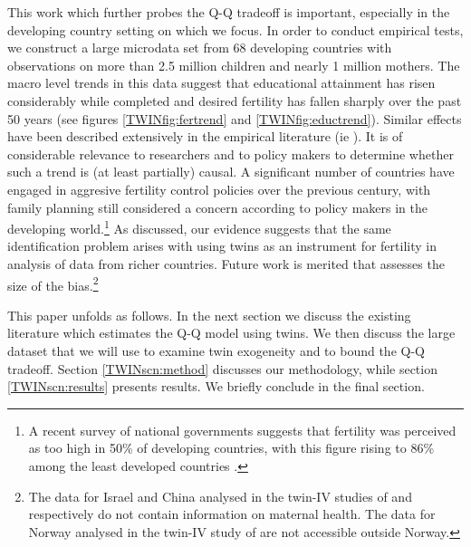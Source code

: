 This work which further probes the Q-Q tradeoff is important, especially in the 
developing country setting on which we focus. In order to conduct empirical tests, 
we construct a large microdata set from 68 developing countries with observations on 
more than 2.5 million children and nearly 1 million mothers. The macro level trends in 
this data suggest that educational attainment has risen considerably while completed 
and desired fertility has fallen sharply over the past 50 years (see figures 
\ref{TWINfig:fertrend} and \ref{TWINfig:eductrend}). Similar effects have been described 
extensively in the empirical literature (ie \citet{Hanushek1992}). It is of considerable 
relevance to researchers and to policy makers to determine whether such a trend is (at 
least partially) causal. A significant number of countries have engaged in aggresive 
fertility control policies over the previous century, with family planning still 
considered a concern according to policy makers in the developing world.\footnote{A 
recent survey of national governments suggests that fertility was perceived as too 
high in 50\% of developing countries, with this figure rising to 86\% among the least 
developed countries \citet{UN2010}.} As discussed, our evidence suggests that the same 
identification problem arises with using twins as an instrument for fertility in 
analysis of data from richer countries. Future work is merited that assesses the size 
of the bias.\footnote{The data for Israel and China analysed in the twin-IV studies of 
\citet{Angristetal2010} and \citet{RosenzweigZhang2009} respectively do not contain 
information on maternal health. The data for Norway analysed in the twin-IV study of 
\citet{Blacketal2005} are not accessible outside Norway.}

This paper unfolds as follows.  In the next section we discuss the existing 
literature which estimates the Q-Q model using twins.  We then discuss the large
dataset that we will use to examine twin exogeneity and to bound the Q-Q tradeoff.
Section \ref{TWINscn:method} discusses our methodology, while section 
\ref{TWINscn:results} presents results.  We briefly conclude in the final section.
